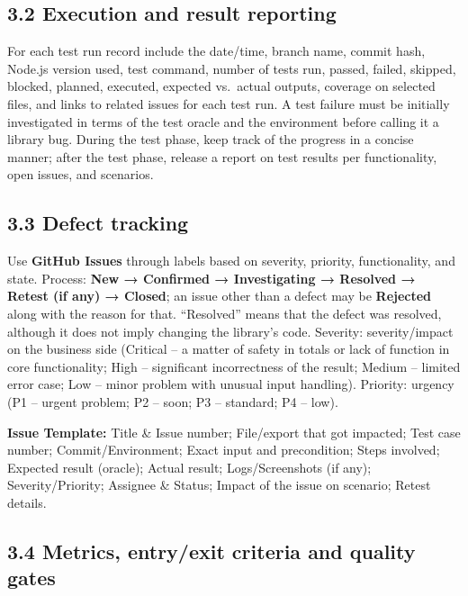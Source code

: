\documentclass[
  9pt,
]{article}
\begin{document}
\subsection{3.2 Execution and result
reporting}\label{execution-and-result-reporting}

For each test run record include the date/time, branch name, commit
hash, Node.js version used, test command, number of tests run, passed,
failed, skipped, blocked, planned, executed, expected vs.~actual
outputs, coverage on selected files, and links to related issues for
each test run. A test failure must be initially investigated in terms of
the test oracle and the environment before calling it a library bug.
During the test phase, keep track of the progress in a concise manner;
after the test phase, release a report on test results per
functionality, open issues, and scenarios.

\subsection{3.3 Defect tracking}\label{defect-tracking}

Use \textbf{GitHub Issues} through labels based on severity, priority,
functionality, and state. Process: \textbf{New → Confirmed →
Investigating → Resolved → Retest (if any) → Closed}; an issue other
than a defect may be \textbf{Rejected} along with the reason for that.
``Resolved'' means that the defect was resolved, although it does not
imply changing the library's code. Severity: severity/impact on the
business side (Critical -- a matter of safety in totals or lack of
function in core functionality; High -- significant incorrectness of the
result; Medium -- limited error case; Low -- minor problem with unusual
input handling). Priority: urgency (P1 -- urgent problem; P2 -- soon; P3
-- standard; P4 -- low).

\textbf{Issue Template:} Title \& Issue number; File/export that got
impacted; Test case number; Commit/Environment; Exact input and
precondition; Steps involved; Expected result (oracle); Actual result;
Logs/Screenshots (if any); Severity/Priority; Assignee \& Status; Impact
of the issue on scenario; Retest details.

\subsection{3.4 Metrics, entry/exit criteria and quality
gates}\label{metrics-entryexit-criteria-and-quality-gates}
\end{document}

